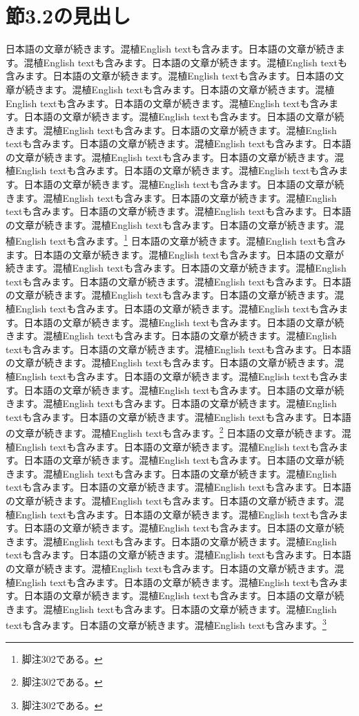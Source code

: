 \documentclass[pdflatex,book]{jlreq}
\begin{document}
\section{節3.2の見出し}
日本語の文章が続きます。混植English textも含みます。日本語の文章が続きます。混植English textも含みます。日本語の文章が続きます。混植English textも含みます。日本語の文章が続きます。混植English textも含みます。日本語の文章が続きます。混植English textも含みます。日本語の文章が続きます。混植English textも含みます。日本語の文章が続きます。混植English textも含みます。日本語の文章が続きます。混植English textも含みます。日本語の文章が続きます。混植English textも含みます。日本語の文章が続きます。混植English textも含みます。日本語の文章が続きます。混植English textも含みます。日本語の文章が続きます。混植English textも含みます。日本語の文章が続きます。混植English textも含みます。日本語の文章が続きます。混植English textも含みます。日本語の文章が続きます。混植English textも含みます。日本語の文章が続きます。混植English textも含みます。日本語の文章が続きます。混植English textも含みます。日本語の文章が続きます。混植English textも含みます。日本語の文章が続きます。混植English textも含みます。日本語の文章が続きます。混植English textも含みます。\footnote{脚注302である。}
日本語の文章が続きます。混植English textも含みます。日本語の文章が続きます。混植English textも含みます。日本語の文章が続きます。混植English textも含みます。日本語の文章が続きます。混植English textも含みます。日本語の文章が続きます。混植English textも含みます。日本語の文章が続きます。混植English textも含みます。日本語の文章が続きます。混植English textも含みます。日本語の文章が続きます。混植English textも含みます。日本語の文章が続きます。混植English textも含みます。日本語の文章が続きます。混植English textも含みます。日本語の文章が続きます。混植English textも含みます。日本語の文章が続きます。混植English textも含みます。日本語の文章が続きます。混植English textも含みます。日本語の文章が続きます。混植English textも含みます。日本語の文章が続きます。混植English textも含みます。日本語の文章が続きます。混植English textも含みます。日本語の文章が続きます。混植English textも含みます。日本語の文章が続きます。混植English textも含みます。日本語の文章が続きます。混植English textも含みます。日本語の文章が続きます。混植English textも含みます。\footnote{脚注302である。}
日本語の文章が続きます。混植English textも含みます。日本語の文章が続きます。混植English textも含みます。日本語の文章が続きます。混植English textも含みます。日本語の文章が続きます。混植English textも含みます。日本語の文章が続きます。混植English textも含みます。日本語の文章が続きます。混植English textも含みます。日本語の文章が続きます。混植English textも含みます。日本語の文章が続きます。混植English textも含みます。日本語の文章が続きます。混植English textも含みます。日本語の文章が続きます。混植English textも含みます。日本語の文章が続きます。混植English textも含みます。日本語の文章が続きます。混植English textも含みます。日本語の文章が続きます。混植English textも含みます。日本語の文章が続きます。混植English textも含みます。日本語の文章が続きます。混植English textも含みます。日本語の文章が続きます。混植English textも含みます。日本語の文章が続きます。混植English textも含みます。日本語の文章が続きます。混植English textも含みます。日本語の文章が続きます。混植English textも含みます。日本語の文章が続きます。混植English textも含みます。\footnote{脚注302である。}
\end{document}
